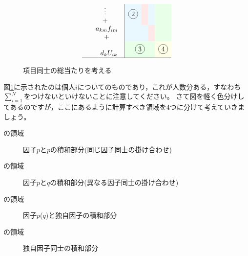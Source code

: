 \documentclass{ltjsbook}
\begin{document}
\begin{figure}[ht]
\[\begin{array}{rl|cccccc|}
			        & \hspace{10pt}\begin{array}{c}\vdots\\+\end{array}     & \multicolumn{3}{>{\columncolor{cyan!9}}c}{\circled{2}}  & \multicolumn{1}{>{\columncolor{red!9}}c}{}               & \multicolumn{1}{>{\columncolor{cyan!9}}c}{}            & \multicolumn{1}{>{\columncolor{green!9}}c}{}                                         \\
			        & \begin{array}{c}a_{km}f_{im}\\+\end{array}            & \multicolumn{4}{>{\columncolor{cyan!9}}c}{}             & \multicolumn{1}{>{\columncolor{red!9}}c}{}               & \multicolumn{1}{>{\columncolor{green!9}}c}{}                                                                                                  \\
			        & \hspace{7pt}\begin{array}{c}\\d_kU_{ik}\\ \end{array} & \multicolumn{5}{>{\columncolor{green!9}}c}{\circled{3}} & \multicolumn{1}{>{\columncolor{yellow!9}}c}{\circled{4}}                                                                                                                                                 \\\hline
		\end{array}
	\]
	\caption{項目同士の総当たりを考える}
	\label{x03_multiply}
\end{figure}

図\ref{x03_multiply}に示されたのは個人$i$についてのものであり，これが人数分ある，すなわち$\sum_{i=1}^N$をつけないといけないことに注意してください。
さて図を軽く色分けしてあるのですが，ここにあるように計算すべき領域を4つに分けて考えていきましょう。
\begin{description}
	\item[の領域] 因子$p$と$p$の積和部分(同じ因子同士の掛け合わせ)
	\item[の領域] 因子$p$と$q$の積和部分(異なる因子同士の掛け合わせ)
	\item[の領域] 因子$p$($q$)と独自因子の積和部分
	\item[の領域] 独自因子同士の積和部分
\end{description}
\end{document}
